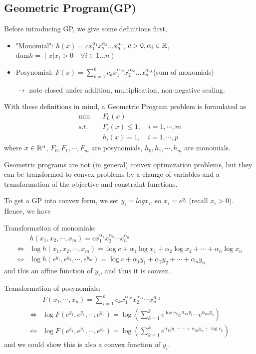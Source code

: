 \vspace{0.5cm}
\subsection{Geometric Program(GP)}
Before introducing GP, we give some definitions first,
\begin{itemize}
	\item "Monomial": $h(x) = cx_1^{\alpha_1}x_2^{\alpha_2}...x_n^{\alpha_n}$, $c>0, \alpha_i\in \mathbb{R}$, $\text{dom} h = (x\vert x_i>0 \quad \forall i\in {1...n})$
	
	\item Posynomial: $F(x) = \sum^k_{k=1}c_kx_1^{\alpha_{1k}}x_2^{\alpha_{2k}}...x_n^{\alpha_{nk}}$(sum of monomials)
	
	$\rightarrow$ note closed under addition, multiplication, non-negative scaling.
\end{itemize}

With these definitions in mind, a Geometric Program problem is formulated as 
\begin{align*}
\min\quad &F_0(x)\\
s.t. \quad&F_i(x)\leq 1,\quad i = 1,\cdots,m\\
&h_i(x)= 1,\quad i = 1,\cdots,p
\end{align*}
where $x\in\mathbb{R}^{n}$, $F_0, F_1,\cdots,F_m$ are posynomials, $h_0, h_1,\cdots,h_m$ are monomials. 


Geometric programs are not (in general) convex optimization problems, but they can be transformed to convex problems by a change of variables and a transformation of the objective and constraint functions.

To get a GP into convex form, we set $y_i = log x_i$, so $x_i = e^{y_i}$ (recall $x_i > 0$). Hence, we have

Transformation of monomials:
\begin{align*}
&h(x_1,x_2,\cdots,x_m) = cx_1^{\alpha_1}x_2^{\alpha_2}\cdots x_n^{\alpha_n}\\
\Leftrightarrow& \log h(x_1,x_2,\cdots,x_m) = \log c + \alpha_1 \log x_1 +\alpha_2 \log x_2 + \cdots + \alpha_n \log x_n\\
\Leftrightarrow& \log h(e^{y_1},e^{y_2},\cdots,e^{y_m}) = \log c + \alpha_1 y_1 +\alpha_2 y_2 + \cdots + \alpha_n y_n
\end{align*}
and this an affine function of $y_i$, and thus it is convex.

Transformation of posynomials:
\begin{align*}
&F(x_1,\cdots,x_n) = \sum^k_{i=1}c_kx_1^{\alpha_{1k}}x_2^{\alpha_{2k}}\cdots x_n^{\alpha_{nk}}\\
\Leftrightarrow& \log F(e^{y_1},e^{y_2},\cdots,e^{y_n}) = \log(\sum^k_{k=1}e^{\log c_k}e^{\alpha_{1k}y_1}\cdots e^{\alpha_{nk}y_n})\\
\Leftrightarrow& \log F(e^{y_1},e^{y_2},\cdots,e^{y_n})             =\log(\sum^k_{k=1}e^{\alpha_{1k}y_1+\cdots+\alpha_{nk}y_n+\log c_k})
\end{align*}
and we could show this is also a convex function of $y_i$.

